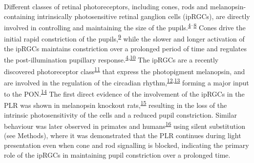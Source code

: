\documentclass[
]{article}
\begin{document}
Different classes of retinal photoreceptors, including cones, rods and melanopsin-containing intrinsically photosensitive retinal ganglion cells (ipRGCs), are directly involved in controlling and maintaining the size of the pupils.\textsuperscript{\protect\hyperlink{ref-McDougal2010}{4}--\protect\hyperlink{ref-Woelders2018}{8}} Cones drive the initial rapid constriction of the pupils,\textsuperscript{\protect\hyperlink{ref-Mathot2018}{9}} while the slower and longer activation of the ipRGCs maintains constriction over a prolonged period of time and regulates the post-illumination pupillary response.\textsuperscript{\protect\hyperlink{ref-McDougal2010}{4},\protect\hyperlink{ref-Markwell2010}{10}} The ipRGCs are a recently discovered photoreceptor class\textsuperscript{\protect\hyperlink{ref-Provencio2000}{11}} that express the photopigment melanopsin, and are involved in the regulation of the circadian rhythm,\textsuperscript{\protect\hyperlink{ref-Panda2002}{12},\protect\hyperlink{ref-Ruby2002}{13}} forming a major input to the PON.\textsuperscript{\protect\hyperlink{ref-Dacey2003}{14}} The first direct evidence of the involvement of the ipRGCs in the PLR was shown in melanopsin knockout rats,\textsuperscript{\protect\hyperlink{ref-Lucas2003}{15}} resulting in the loss of the intrinsic photosensitivity of the cells and a reduced pupil constriction. Similar behaviour was later observed in primates and humans\textsuperscript{\protect\hyperlink{ref-Gamlin2007}{16}} using silent substitution (see Methods), where it was demonstrated that the PLR continues during light presentation even when cone and rod signalling is blocked, indicating the primary role of the ipRGCs in maintaining pupil constriction over a prolonged time.
\end{document}
